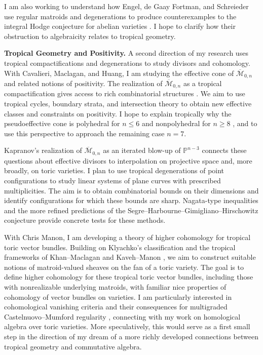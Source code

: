 \documentclass[11pt,reqno]{amsart}
\newcommand{\Mbar}{\overline{\mathcal{M}}}
\newcommand{\Pp}{\mathbb{P}}
\begin{document}
I am also working to understand how Engel, de Gaay Fortman, and Schreieder use regular matroids and degenerations to produce counterexamples to the integral Hodge conjecture for abelian varieties \cite{EGFS25}. I hope to clarify how their obstruction to algebraicity relates to tropical geometry.

\textbf{Tropical Geometry and Positivity.}
A second direction of my research uses tropical compactifications and degenerations to study divisors and cohomology. With Cavalieri, Maclagan, and Huang, I am studying the effective cone of $\Mbar_{0,n}$ and related notions of positivity. The realization of $\Mbar_{0,n}$ as a tropical compactification gives access to rich combinatorial structures \cite{GM10}. We aim to use tropical cycles, boundary strata, and intersection theory to obtain new effective classes and constraints on positivity. I hope to explain tropically why the pseudoeffective cone is polyhedral for $n\leq6$ \cite{HT02,Cas09} and nonpolyhedral for $n\geq8$ \cite{CLTU23,Mul25}, and to use this perspective to approach the remaining case $n=7$.

Kapranov's realization of $\Mbar_{0,n}$ as an iterated blow-up of $\Pp^{n-3}$ \cite{Kap93} connects these questions about effective divisors to interpolation on projective space and, more broadly, on toric varieties. I plan to use tropical degenerations of point configurations to study linear systems of plane curves with prescribed multiplicities. The aim is to obtain combinatorial bounds on their dimensions and identify configurations for which these bounds are sharp. Nagata-type inequalities and the more refined predictions of the Segre--Harbourne--Gimigliano--Hirschowitz conjecture \cite{CHMR13} provide concrete tests for these methods.

With Chris Manon, I am developing a theory of higher cohomology for tropical toric vector bundles. Building on Klyachko's classification \cite{Kly90} and the tropical frameworks of Khan--Maclagan \cite{KhM26} and Kaveh--Manon \cite{KM24}, we aim to construct suitable notions of matroid-valued sheaves on the fan of a toric variety. The goal is to define higher cohomology for these tropical toric vector bundles, including those with nonrealizable underlying matroids, with familiar nice properties of cohomology of vector bundles on varieties. I am particularly interested in cohomological vanishing criteria and their consequences for multigraded Castelnuovo--Mumford regularity \cite{MS04}, connecting with my work on homological algebra over toric varieties. More speculatively, this  would serve as a first small step in the direction of my dream of a more richly developed connections between tropical geometry and commutative algebra. 
\end{document}
